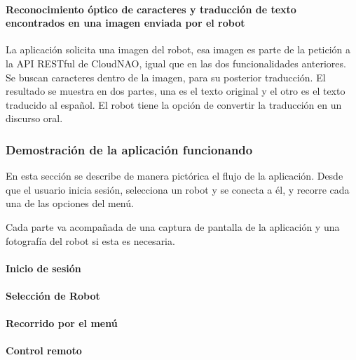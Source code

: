 \paragraph{Reconocimiento óptico de caracteres y traducción de texto encontrados en una imagen enviada por el robot}
\label{\detokenize{users_docs:reconocimiento-optico-de-caracteres-y-traduccion-de-texto-encontrados-en-una-imagen-enviada-por-el-robot}}
La aplicación solicita una imagen del robot, esa imagen es parte de la petición
a la API RESTful de CloudNAO, igual que en las dos funcionalidades anteriores.
Se buscan caracteres dentro de la imagen, para su posterior traducción.
El resultado se muestra en dos partes, una es el texto original y el otro
es el texto traducido al español. El robot tiene la opción de convertir la
traducción en un discurso oral.


\subsubsection{Demostración de la aplicación funcionando}
\label{\detokenize{users_docs:demostracion-de-la-aplicacion-funcionando}}
En esta sección se describe de manera pictórica el flujo de la aplicación.
Desde que el usuario inicia sesión, selecciona un robot y se conecta a él,
y recorre cada una de las opciones del menú.

Cada parte va acompañada de una captura de pantalla de la aplicación y
una fotografía del robot si esta es necesaria.


\paragraph{Inicio de sesión}
\label{\detokenize{users_docs:inicio-de-sesion}}

\paragraph{Selección de Robot}
\label{\detokenize{users_docs:seleccion-de-robot}}

\paragraph{Recorrido por el menú}
\label{\detokenize{users_docs:recorrido-por-el-menu}}

\paragraph{Control remoto}
\label{\detokenize{users_docs:control-remoto}}


